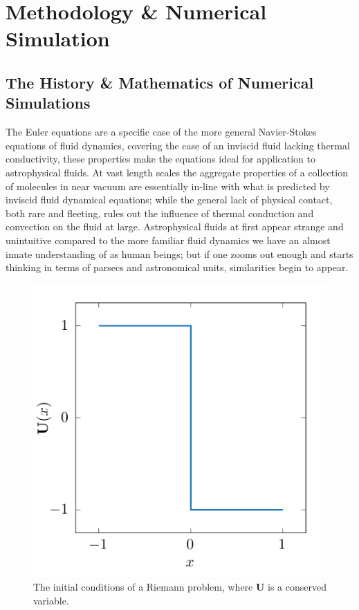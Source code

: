 \chapter{Methodology \& Numerical Simulation}
\label{ch:numsim}




\section{The History \& Mathematics of Numerical Simulations}
\label{sec:numerical-math}
\label{sec:numsim}


The Euler equations are a specific case of the more general Navier-Stokes equations of fluid dynamics, covering the case of an inviscid fluid lacking thermal conductivity, these properties make the equations ideal for application to astrophysical fluids.
At vast length scales the aggregate properties of a collection of molecules in near vacuum are essentially in-line with what is predicted by inviscid fluid dynamical equations; while the general lack of physical contact, both rare and fleeting, rules out the influence of thermal conduction and convection on the fluid at large.
Astrophysical fluids at first appear strange and unintuitive compared to the more familiar fluid dynamics we have an almost innate understanding of as human beings; but if one zooms out enough and starts thinking in terms of parsecs and astronomical units, similarities begin to appear. 

\begin{figure}
  \centering
  \includegraphics[]{assets/riemann-interface/riemann.pdf}
  \caption[Initial conditions of a Riemann problem]{The initial conditions of a Riemann problem, where $\mathbf{U}$ is a conserved variable.}
  \label{fig:riemann}
\end{figure}


